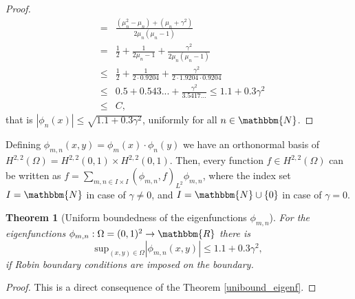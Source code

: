 \documentclass[a4paper,11pt]{article}
\theoremstyle{plain} %
\newtheorem{theorem}{Theorem}[section]
\theoremstyle{definition} %
\theoremstyle{remark} %
\theoremstyle{remark}
\begin{document}
\begin{proof}
\begin{eqnarray*}
 & = & \frac{\left( \mu_n^2 - \mu_n \right) + \left(\mu_n + \gamma^2 \right)}{2 \mu_n (\mu_n-1 )} \\
 & = & \frac{1}{2} + \frac{ 1}{2 \mu_n-1 } + \frac{\gamma^2 }{2 \mu_n (\mu_n-1 )} \\
 & \leq & \frac{1}{2} + \frac{ 1}{2 \cdot 0.9204 } + \frac{\gamma^2 }{2 \cdot 1.9204 \cdot 0.9204} \\
  & \leq & 0.5 + 0.543... + \tfrac{\gamma^2 }{3.5417...} \leq 1.1 + 0.3\gamma^2 \\
 & \leq & C,
\end{eqnarray*}
that is $ | \phi_n (x)  | \leq \sqrt{1.1 + 0.3\gamma^2 } $, uniformly for all $n \in \mathbbm{N} $. 
\end{proof}
Defining $ \phi_{m,n} (x,y) = \phi_m (x) \cdot \phi_n (y) $ we have an orthonormal basis of $ H^{2,2} (\Omega ) = H^{2,2} (0,1 ) \times H^{2,2} (0,1 ) $.
Then, every function $ f \in H^{2,2} (\Omega ) $ can be written as $ f = \sum_{m,n \in I \times I } (\phi_{m,n}, f)_{L^2 } \phi_{m,n} $, where the index set $I = \mathbbm{N} $ in case of $ \gamma \not= 0 $, and $I = \mathbbm{N} \cup \{ 0 \} $ in case of $ \gamma = 0 $.

\begin{theorem}[Uniform boundedness of the eigenfunctions $\phi_{m,n} $]
For the eigenfunctions $\phi_{m,n} : \Omega = (0,1)^2 \rightarrow \mathbbm{R} $ there is 
\begin{equation*} \label{unibound_eigenf_2d}
\mathrm{sup}_{(x,y) \in \Omega }  | \phi_{m,n} (x, y)  | \leq 1.1 + 0.3\gamma^2 ,
\end{equation*}
if Robin boundary conditions are imposed on the boundary.
\end{theorem}

\begin{proof}
This is a direct consequence of the Theorem \ref{unibound_eigenf}.
\end{proof}
\end{document}
